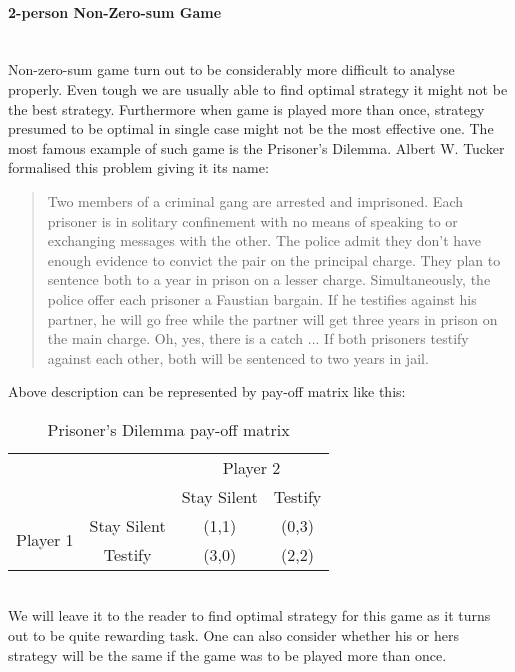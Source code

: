 \documentclass[10pt, a4paper]{report}
\begin{document}
\paragraph{2-person Non-Zero-sum Game} ~\\
Non-zero-sum game turn out to be considerably more difficult to analyse properly. Even tough we are usually able to find optimal strategy it might not be the best strategy. Furthermore when game is played more than once, strategy presumed to be optimal in single case might not be the most effective one. The most famous example of such game is the Prisoner's Dilemma. Albert W. Tucker formalised this problem giving it its name:
\begin{quotation}
    Two members of a criminal gang are arrested and imprisoned. Each prisoner is in solitary confinement with no means of speaking to or exchanging messages with the other. The police admit they don't have enough evidence to convict the pair on the principal charge. They plan to sentence both to a year in prison on a lesser charge. Simultaneously, the police offer each prisoner a Faustian bargain. If he testifies against his partner, he will go free while the partner will get three years in prison on the main charge. Oh, yes, there is a catch ... If both prisoners testify against each other, both will be sentenced to two years in jail.
\end{quotation}
Above description can be represented by pay-off matrix like this:
\begin{table}[ht!]
	\hspace{-2em}
	\centering
	\begin{tabular}{cccc|}
		& & \multicolumn{2}{c}{Player 2}                                              \\ \cline{3-4}
		& & Stay Silent &  \multicolumn{1}{c}{Testify}                                \\ \cline{3-4}
		\multirow{2}{*}{Player 1} & \multicolumn{1}{|c|}{Stay Silent} & (1,1) & (0,3) \\
		& \multicolumn{1}{|c|}{Testify} & (3,0) & (2,2)                               \\ \cline{3-4}
	\end{tabular}
	\caption{Prisoner's Dilemma pay-off matrix}
\end{table}
\\
We will leave it to the reader to find optimal strategy for this game as it turns out to be quite rewarding task. One can also consider whether his or hers strategy will be the same if the game was to be played more than once.
\end{document}
